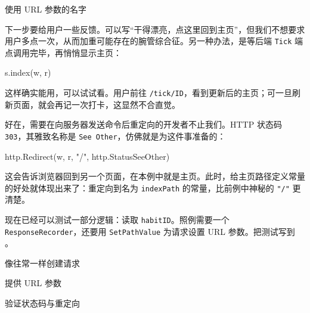 \begin{codeannotations}
\item 使用 URL 参数的名字
\end{codeannotations}

下一步要给用户一些反馈。可以写“干得漂亮，点这里回到主页”，但我们不想要求用户多点一次，从而加重可能存在的腕管综合征。另一种办法，是等后端 \texttt{Tick} 端点调用完毕，再悄悄显示主页：

\begin{gocode}[]
s.index(w, r)
\end{gocode}

这样确实能用，可以试试看。用户前往 \texttt{/tick/ID}，看到更新后的主页；可一旦刷新页面，就会再记一次打卡，这显然不合直觉。

好在，需要在向服务器发送命令后重定向的开发者不止我们。HTTP 状态码 \texttt{303}，其雅致名称是 \texttt{See Other}，仿佛就是为这件事准备的：

\begin{gocode}[]
http.Redirect(w, r, "/", http.StatusSeeOther)
\end{gocode}

这会告诉浏览器回到另一个页面，在本例中就是主页。此时，给主页路径定义常量的好处就体现出来了：重定向到名为 \texttt{indexPath} 的常量，比前例中神秘的 \texttt{"/"} 更清楚。

现在已经可以测试一部分逻辑：读取 \texttt{habitID}。照例需要一个 \texttt{ResponseRecorder}，还要用 \texttt{SetPathValue} 为请求设置 URL 参数。把测试写到 。


\begin{codeannotations}
\item 像往常一样创建请求
\item 提供 URL 参数
\item 验证状态码与重定向
\end{codeannotations}

